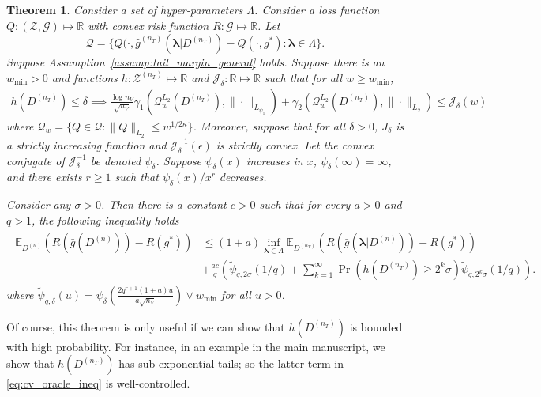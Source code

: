 \documentclass[10pt]{book}
\newtheorem{theorem}{Theorem}
\theoremstyle{definition}
\begin{document}
\begin{theorem}
	\label{thrm:jean_cv}
	Consider a set of hyper-parameters $\Lambda$. Consider a loss function $Q:(\mathcal{Z}, \mathcal{G}) \mapsto \mathbb{R}$ with convex risk function $R: \mathcal{G} \mapsto \mathbb{R}$. Let
	$$
	\mathcal{Q} = \{ 
	Q(\cdot, \hat{g}^{(n_T)}(\boldsymbol{\lambda} | D^{(n_T)}) - Q(\cdot, g^*) : \boldsymbol{\lambda} \in \Lambda \}.
	$$
	Suppose Assumption~\ref{assump:tail_margin_general} holds.
	Suppose there is an $w_{\min} > 0$ and
	functions $h: {\mathcal{Z}}^{(n_T)} \mapsto \mathbb{R}$
	and $\mathcal{J}_\delta: \mathbb{R}\mapsto \mathbb{R}$ such that
	for all $w \ge w_{\min}$,
	\begin{align}
	\label{eq:h_to_J}
	h(D^{(n_{T})})\le\delta\implies
	\frac{\log n_{V}}{\sqrt{n_{V}}}
	\gamma_{1}\left(\mathcal{Q}_{w}^{L_{2}}(D^{(n_{T})}),\|\cdot\|_{L_{\psi_{1}}}\right)
	+\gamma_{2}\left(\mathcal{Q}_{w}^{L_{2}}(D^{(n_{T})}),\|\cdot\|_{L_{2}}\right)\le \mathcal{J}_{\delta}(w)
	\end{align}
	where $\mathcal{Q}_w = \{Q \in \mathcal{Q}: \| Q \|_{L_2} \le w^{1/2\kappa} \}$.
	Moreover, suppose that for all $\delta > 0$, $J_\delta$ is a strictly increasing function and $\mathcal{J}_\delta^{-1}(\epsilon)$ is strictly convex.
	Let the convex conjugate of $\mathcal{J}^{-1}_\delta$ be denoted $\psi_\delta$.
	Suppose $\psi_\delta(x)$ increases in $x$, $\psi_\delta(\infty ) = \infty$, and there exists $r \ge 1$ such that $\psi_\delta(x)/x^r$ decreases.

	Consider any $\sigma > 0$. Then there is a constant $c > 0$ such that for every $a > 0$ and $q > 1$, the following inequality holds
	\begin{align}
	\begin{split}
	\mathbb{E}_{D^{(n)}} 
	\left(
	R\left(\bar{g} ( {D^{(n)}} ) \right )
	- R (g^*)
	\right)
	&\le
	(1+a) \inf_{\boldsymbol{\lambda} \in \Lambda} 
	\mathbb{E}_{D^{(n_T)}}
	\left(
	R\left(\bar{g} ( \hat{\boldsymbol \lambda} | {D^{(n)}} ) \right )
	- R (g^*)
	\right)
	\\
	& +
	\frac{ac}{q}
	\left(
	\tilde{\psi}_{q,2\sigma}(1/q)
	+\sum_{k=1}^{\infty}
	\Pr\left(h\left(D^{(n_{T})}\right)\ge2^{k}\sigma\right)
	\tilde{\psi}_{q,2^{k}\sigma}(1/q)
	\right).
	\label{eq:cv_oracle_ineq}
	\end{split}
	\end{align}
	where $\tilde{\psi}_{q, \delta}(u) = \psi_\delta\left(\frac{2q^{r+1}(1 + a)u}{a\sqrt{n_V}}\right) \vee w_{\min}$ for all $u > 0$.
\end{theorem}
Of course, this theorem is only useful if we can show that $h(D^{(n_T)})$ is bounded with high probability.
For instance, in an example in the main manuscript, we show that $h(D^{(n_T)})$ has sub-exponential tails; so the latter term in \eqref{eq:cv_oracle_ineq} is well-controlled.
\end{document}
